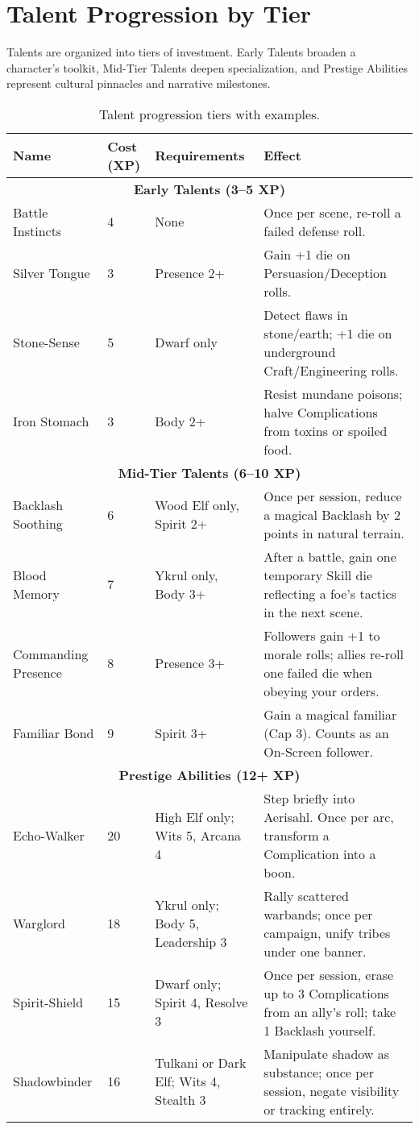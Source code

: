 \documentclass[12pt]{book}
\begin{document}
\section{Talent Progression by Tier}

Talents are organized into tiers of investment. Early Talents broaden a character’s toolkit, Mid-Tier Talents deepen specialization, and Prestige Abilities represent cultural pinnacles and narrative milestones.  

\begin{table}[h]
\centering
\renewcommand{\arraystretch}{1.3}
\begin{tabular}{|p{3cm}|p{2cm}|p{3cm}|p{6cm}|}
\hline
\textbf{Name} & \textbf{Cost (XP)} & \textbf{Requirements} & \textbf{Effect} \\
\hline
\multicolumn{4}{|c|}{\textbf{Early Talents (3–5 XP)}} \\
\hline
Battle Instincts & 4 & None & Once per scene, re-roll a failed defense roll. \\
Silver Tongue & 3 & Presence 2+ & Gain +1 die on Persuasion/Deception rolls. \\
Stone-Sense & 5 & Dwarf only & Detect flaws in stone/earth; +1 die on underground Craft/Engineering rolls. \\
Iron Stomach & 3 & Body 2+ & Resist mundane poisons; halve Complications from toxins or spoiled food. \\
\hline
\multicolumn{4}{|c|}{\textbf{Mid-Tier Talents (6–10 XP)}} \\
\hline
Backlash Soothing & 6 & Wood Elf only, Spirit 2+ & Once per session, reduce a magical Backlash by 2 points in natural terrain. \\
Blood Memory & 7 & Ykrul only, Body 3+ & After a battle, gain one temporary Skill die reflecting a foe’s tactics in the next scene. \\
Commanding Presence & 8 & Presence 3+ & Followers gain +1 to morale rolls; allies re-roll one failed die when obeying your orders. \\
Familiar Bond & 9 & Spirit 3+ & Gain a magical familiar (Cap 3). Counts as an On-Screen follower. \\
\hline
\multicolumn{4}{|c|}{\textbf{Prestige Abilities (12+ XP)}} \\
\hline
Echo-Walker & 20 & High Elf only; Wits 5, Arcana 4 & Step briefly into Aerisahl. Once per arc, transform a Complication into a boon. \\
Warglord & 18 & Ykrul only; Body 5, Leadership 3 & Rally scattered warbands; once per campaign, unify tribes under one banner. \\
Spirit-Shield & 15 & Dwarf only; Spirit 4, Resolve 3 & Once per session, erase up to 3 Complications from an ally’s roll; take 1 Backlash yourself. \\
Shadowbinder & 16 & Tulkani or Dark Elf; Wits 4, Stealth 3 & Manipulate shadow as substance; once per session, negate visibility or tracking entirely. \\
\hline
\end{tabular}
\caption{Talent progression tiers with examples.}
\end{table}
\end{document}
